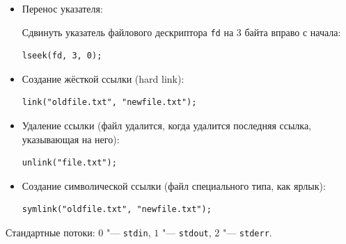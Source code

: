\begin{itemize}
\begin{verbatim}
int fd = open("from.txt", O_RDONLY);
int to = open("to.txt", O_WRONLY | O_CREAT);
char buf[10];
while ((n = read(fd, buf, sizeof(buf))) > 0) {
	write(to, buf, n);
}
\end{verbatim}

\item Перенос указателя:

Сдвинуть указатель файлового дескриптора \texttt{fd} на 3 байта вправо с начала:
\begin{verbatim}
lseek(fd, 3, 0);
\end{verbatim}

\item Создание жёсткой ссылки (hard link):

\begin{verbatim}
link("oldfile.txt", "newfile.txt");
\end{verbatim}

\item Удаление ссылки (файл удалится, когда удалится последняя ссылка, указывающая на него):

\begin{verbatim}
unlink("file.txt");
\end{verbatim}

\item Создание символической ссылки (файл специального типа, как ярлык):

\begin{verbatim}
symlink("oldfile.txt", "newfile.txt");
\end{verbatim}

\end{itemize}

Стандартные потоки: $0$ "--- \texttt{stdin}, $1$ "--- \texttt{stdout}, $2$ "--- \texttt{stderr}.
